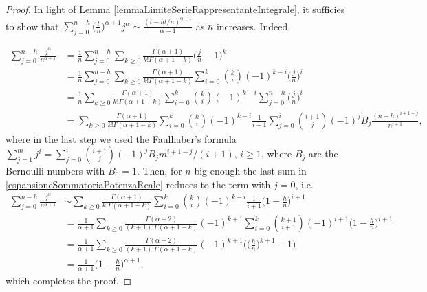 \documentclass[10pt,a4paper]{amsart}
\begin{document}
\begin{proof}
In light of Lemma \ref{lemmaLimiteSerieRappresentanteIntegrale}, it sufficies to show that $ \sum_{j = 0}^{n-h} \big(\frac{t}{n}\big)^{\alpha+1} j^\alpha \sim \frac{(t-ht/n)^{\alpha+1}}{\alpha+1}$ as $n$ increases. Indeed,

\begin{align}
	\sum_{j=0}^{n-h} \frac{j^\alpha}{n^{\alpha+1}}  & = \frac{1}{n}\sum_{j=0}^{n-h}\sum_{k\ge0} \frac{\Gamma(\alpha+1)}{k!\Gamma(\alpha+1-k)}  \Big(\frac{j}{n}-1\Big)^k \nonumber \\
	&= \frac{1}{n}\sum_{j=0}^{n-h}\sum_{k\ge0} \frac{\Gamma(\alpha+1)}{k!\Gamma(\alpha+1-k)}  \sum_{i=0}^k \binom{k}{i} (-1)^{k-i} \Big(\frac{j}{n}\Big)^i \nonumber\\ %
	& = \frac{1}{n}\sum_{k\ge0} \frac{\Gamma(\alpha+1)}{k!\Gamma(\alpha+1-k)}  \sum_{i=0}^k \binom{k}{i} (-1)^{k-i} \sum_{j=0}^{n-h}\Big(\frac{j}{n}\Big)^i \nonumber\\
	&= \sum_{k\ge0} \frac{\Gamma(\alpha+1)}{k!\Gamma(\alpha+1-k)}  \sum_{i=0}^k \binom{k}{i} (-1)^{k-i} \frac{1}{i+1}\sum_{j=0}^i \binom{i+1}{j} (-1)^j B_j \frac{(n-h)^{i+1-j}}{n^{i+1}}, \label{espansioneSommatoriaPotenzaReale} %
\end{align}
where in the last step we used the Faulhaber's formula $\sum_{j=1}^m j^i = \sum_{j=0}^i \binom{i+1}{j} (-1)^j B_j m^{i+1-j} / (i+1)$, $i\ge1$, where $B_j$ are the Bernoulli numbers with $B_0 = 1$. Then, for $n$ big enough the last sum in \eqref{espansioneSommatoriaPotenzaReale} reduces to the term with $j=0$, i.e.
\begin{align}
	\sum_{j=0}^{n-h} \frac{j^\alpha}{n^{\alpha+1}}  & \sim \sum_{k\ge0} \frac{\Gamma(\alpha+1)}{k!\Gamma(\alpha+1-k)}  \sum_{i=0}^k \binom{k}{i} (-1)^{k-i} \frac{1}{i+1} \bigg(1-\frac{h}{n}\bigg)^{i+1}  \nonumber\\
	& = \frac{1}{\alpha+1}\sum_{k\ge0} \frac{\Gamma(\alpha+2)}{(k+1)!\Gamma(\alpha+1-k)} (-1)^{k+1} \sum_{i=0}^k \binom{k+1}{i+1} (-1)^{i+1} \bigg(1-\frac{h}{n}\bigg)^{i+1}  \nonumber\\
	& =  \frac{1}{\alpha+1}\sum_{k\ge0} \frac{\Gamma(\alpha+2)}{(k+1)!\Gamma(\alpha+1-k)} (-1)^{k+1} \Bigg( \bigg(\frac{h}{n}\bigg)^{k+1}- 1\Bigg) \nonumber\\
	& = \frac{1}{\alpha+1} \bigg(1-\frac{h}{n}\bigg)^{\alpha +1},\nonumber
\end{align}
which completes the proof.
\end{proof}
\end{document}
